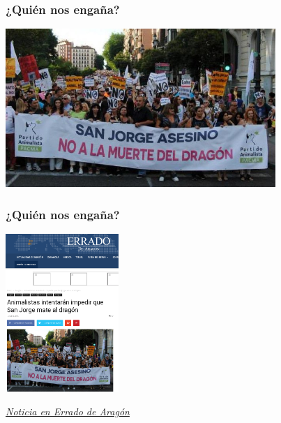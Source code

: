 \documentclass[17pt,aspectratio=169]{beamer}
\begin{document}
\begin{frame}
\frametitle{¿Quién nos engaña?}

\begin{center}
\includegraphics[height=6cm]{figs/san-jorge-asesino}
\end{center}

\end{frame}


\begin{frame}
\frametitle{¿Quién nos engaña?}

\begin{center}
\includegraphics[height=6cm]{figs/san-jorge-asesino-errado}
\end{center}

  \begin{flushright}
    {\em \small
      \href{https://www.erradodearagon.com/animalistas-intentaran-impedir-que-san-jorge-mate-al-dragon/}{Noticia en Errado de Aragón}}
  \end{flushright}

\end{frame}

\end{document}

